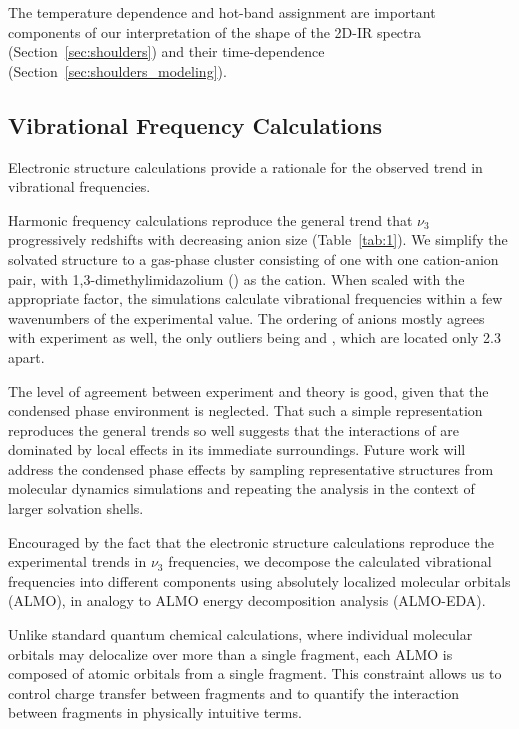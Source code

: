 \documentclass[%
  class = book,%
  crop = false,%
  float = true,%
  multi = true,%
  preview = false,%
]{standalone}
\begin{document}
{The temperature dependence and hot-band assignment are important components of our interpretation of the shape of the 2D-IR spectra (Section~\ref{sec:shoulders}) and their time-dependence (Section~\ref{sec:shoulders_modeling}).

\subsection{Vibrational Frequency Calculations}
\label{sec:vib_calcs}

Electronic structure calculations provide a rationale for the observed trend in vibrational frequencies.

Harmonic frequency calculations reproduce the general trend that \(\nu_3\) progressively redshifts with decreasing anion size (Table~\ref{tab:1}).  We simplify the solvated  structure to a gas-phase cluster consisting of one  with one cation-anion pair, with 1,3-dimethylimidazolium () as the cation. When scaled with the appropriate factor\cite{Merrick2007}, the simulations calculate vibrational frequencies within a few wavenumbers of the experimental value. The ordering of anions mostly agrees with experiment as well, the only outliers being \ce{[TFA]-} and \ce{[SCN]-}, which are located only \SI{2.3}{\wavenumber} apart.

The level of agreement between experiment and theory is good, given that the condensed phase environment is neglected. That such a simple representation reproduces the general trends so well suggests that the interactions of  are dominated by local effects in its immediate surroundings. Future work will address the condensed phase effects by sampling representative structures from molecular dynamics simulations and repeating the analysis in the context of larger solvation shells.

Encouraged by the fact that the electronic structure calculations reproduce the experimental trends in \(\nu_3\) frequencies, we decompose the calculated vibrational frequencies into different components using absolutely localized molecular orbitals (ALMO), in analogy to ALMO energy decomposition analysis (ALMO-EDA).\cite{Khaliullin2006,Khaliullin2007,Khaliullin2008}

Unlike standard quantum chemical calculations, where individual molecular orbitals may delocalize over more than a single fragment, each ALMO is composed of atomic orbitals from a single fragment. This constraint allows us to control charge transfer between fragments and to quantify the interaction between fragments in physically intuitive terms.

}
\end{document}
